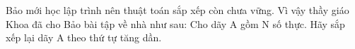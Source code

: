 Bảo mới học lập trình nên thuật toán sắp xếp còn chưa vững. Vì vậy thầy giáo Khoa đã cho Bảo bài tập về nhà như sau: Cho dãy A gồm N số thực. Hãy sắp xếp lại dãy A theo thứ tự tăng dần.